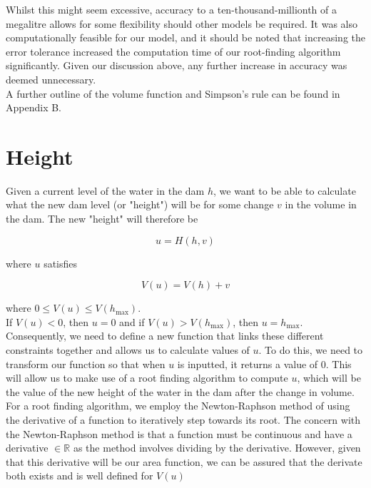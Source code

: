 \documentclass[a4paper, 11pt, oneside]{article}
\begin{document}
Whilst this might seem excessive, accuracy to a ten-thousand-millionth of a megalitre allows for some flexibility should other models be required.  It was also computationally feasible for our model, and it should be noted that increasing the error tolerance increased the computation time of our root-finding algorithm significantly.  Given our discussion above, any further increase in accuracy was deemed unnecessary.\\

A further outline of the volume function and Simpson's rule can be found in Appendix B.

\section{Height}

Given a current level of the water in the dam $h$, we want to be able to calculate what the new dam level (or "height") will be for some change $v$ in the volume in the dam.  The new "height" will therefore be

$$u = H(h,v)$$

where $u$ satisfies

$$V(u) = V(h) + v$$

where $0 \leq V(u) \leq V(h_{\text{max}})$.  \\

If $V(u) < 0$, then $u = 0$ and if $V(u) > V(h_{\text{max}})$, then $u = h_{\text{max}}$.\\

Consequently, we need to define a new function that links these different constraints together and allows us to calculate values of $u$. To do this, we need to transform our function so that when $u$ is inputted, it returns a value of $0$.
This will allow us to make use of a root finding algorithm to compute $u$, which will be the value of the new height of the water in the dam after the change in volume.\\

For a root finding algorithm, we employ the Newton-Raphson method of using the derivative of a function to iteratively step towards its root. The concern with the Newton-Raphson method is that a function must be continuous and have a derivative $\in \mathbb{R}$ as the method involves dividing by the derivative. However, given that this derivative will be our area function, we can be assured that the derivate both exists and is well defined for $V(u)$ \\
\end{document}
